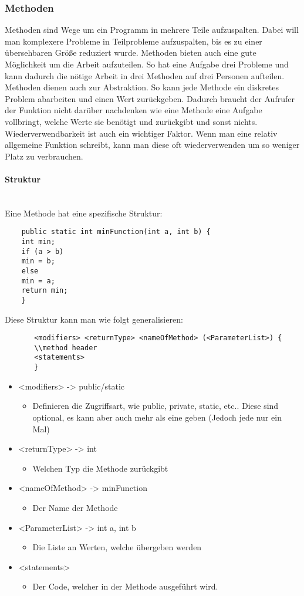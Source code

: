 \documentclass{article}
\newcommand{\paragraphlb}[1]{\paragraph{#1}\mbox{}\\}
\begin{document}
	\subsubsection{Methoden}
	Methoden sind Wege um ein Programm in mehrere Teile aufzuspalten. Dabei will man komplexere Probleme in Teilprobleme aufzuspalten, bis es zu einer übersehbaren Größe reduziert wurde. Methoden bieten auch eine gute Möglichkeit um die Arbeit aufzuteilen. So hat eine Aufgabe drei Probleme und kann dadurch die nötige Arbeit in drei Methoden auf drei Personen aufteilen. \\
	Methoden dienen auch zur Abstraktion. So kann jede Methode ein diskretes Problem abarbeiten und einen Wert zurückgeben. Dadurch braucht der Aufrufer der Funktion nicht darüber nachdenken wie eine Methode eine Aufgabe vollbringt, welche Werte sie benötigt und zurückgibt und sonst nichts. \\
	Wiederverwendbarkeit ist auch ein wichtiger Faktor. Wenn man eine relativ allgemeine Funktion schreibt, kann man diese oft wiederverwenden um so weniger Platz zu verbrauchen. \\
	\paragraphlb{Struktur}
	Eine Methode hat eine spezifische Struktur:
	\begin{verbatim}
	public static int minFunction(int a, int b) {
	int min;
	if (a > b)
	min = b;
	else
	min = a;
	return min;
	}
	\end{verbatim}
	Diese Struktur kann man wie folgt generalisieren:
	\begin{verbatim}
	   <modifiers> <returnType> <nameOfMethod> (<ParameterList>) { 
	   \\method header
	   <statements>
	   }
	\end{verbatim}  
	\begin{itemize}
		\item{<modifiers> -> public/static}
		\begin{itemize}
			\item{Definieren die Zugriffsart, wie public, private, static, etc.. Diese sind optional, es kann aber auch mehr als eine geben (Jedoch jede nur ein Mal)}
		\end{itemize}
		\item{<returnType> -> int}
		\begin{itemize}
			\item{Welchen Typ die Methode zurückgibt}
		\end{itemize}
		\item{<nameOfMethod> -> minFunction}
		\begin{itemize}
			\item{Der Name der Methode}
		\end{itemize}
		\item{<ParameterList> -> int a, int b}
		\begin{itemize}
			\item{Die Liste an Werten, welche übergeben werden}
		\end{itemize}
		\item{<statements>}
		\begin{itemize}
			\item{Der Code, welcher in der Methode ausgeführt wird.}
		\end{itemize}
	\end{itemize}
\end{document}
